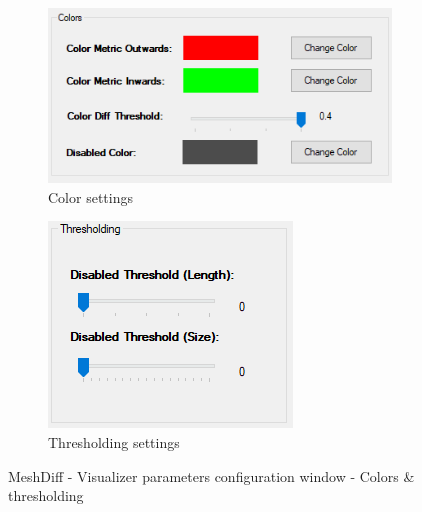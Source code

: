 \begin{figure}[h]
	\centering
	\begin{subfigure}{0.6\textwidth}
		\includegraphics[width=\textwidth]{./img/meshdiff-visualizer_parameters-colors.PNG}
		\caption{Color settings}
		\label{fig:meshdiff-visualizer_parameters_colors}
	\end{subfigure}
	\qquad
	\begin{subfigure}{0.3\textwidth}
		\includegraphics[width=\textwidth]{./img/meshdiff-visualizer_parameters-thresholding.PNG}
		\caption{Thresholding settings}
		\label{fig:meshdiff-visualizer_parameters_thresholding}
	\end{subfigure}
	\caption[MeshDiff - Visualizer parameters - Colors \& thresholding]{MeshDiff - Visualizer parameters configuration window - Colors \& thresholding}
\end{figure}

